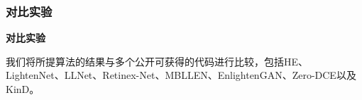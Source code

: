 \documentclass[CJK,aspectratio=169]{beamer}  %
\begin{document}
	\subsubsection{对比实验}
	
	\begin{frame}
		{ \yahei \textbf{对比实验}}
		
		{ \yahei 我们将所提算法的结果与多个公开可获得的代码进行比较，包括HE\textcolor{blue}{\citep{pisano1998contrast}}、LightenNet\textcolor{blue}{\citep{li2018lightennet}}、LLNet\textcolor{blue}{\citep{lore2017llnet}}、Retinex-Net\textcolor{blue}{\citep{wei2018deep}}、MBLLEN\textcolor{blue}{\citep{lv2018mbllen}}、EnlightenGAN\textcolor{blue}{\citep{jiang2021enlightengan}}、Zero-DCE\textcolor{blue}{\citep{guo2020zero}}以及KinD\textcolor{blue}{\citep{zhang2019kindling}}。}
		
		\begin{table}[!htbp]
			\centering
			\tiny
\end{table}
\end{frame}
\end{document}
